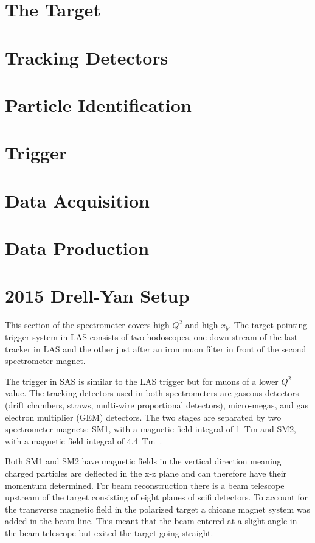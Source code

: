 \section{The Target}

\section{Tracking Detectors}

\section{Particle Identification}

\section{Trigger}

\section{Data Acquisition}

\section{Data Production}

\section{2015 Drell-Yan Setup}


This section of the spectrometer covers high
$Q^2$ and high $x_b$.  The target-pointing trigger system in LAS consists of two
hodoscopes, one down stream of the last tracker in LAS and the other just after
an iron muon filter in front of the second spectrometer magnet.

The trigger in SAS is
similar to the LAS trigger but for muons of a lower $Q^2$ value.  The tracking
detectors used in both spectrometers are gaseous detectors (drift chambers,
straws, multi-wire proportional detectors), micro-megas, and gas electron
multiplier (GEM) detectors.  The two stages are separated by two spectrometer
magnets: SM1, with a magnetic field integral of 1~Tm and SM2, with a magnetic
field integral of 4.4~Tm~\cite{compassSpec}.

Both SM1 and SM2 have magnetic
fields in the vertical direction meaning charged particles are deflected in the
x-z plane and can therefore have their momentum determined.  For beam
reconstruction there is a beam telescope upstream of the target consisting of
eight planes of scifi detectors.  To account for the transverse magnetic field
in the polarized target a chicane magnet system was added in the beam line.
This meant that the beam entered at a slight angle in the beam telescope but
exited the target going straight. \par

